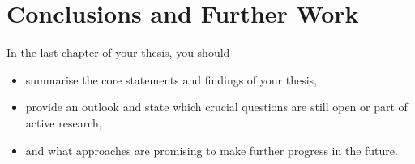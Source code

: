 \chapter{Conclusions and Further Work} 

In the last chapter of your thesis, you should
\begin{itemize}
    \item summarise the core statements and findings of your thesis,
    \item provide an outlook and state which crucial questions are still open or part of
        active research, 
    \item and what approaches are promising to make further progress in the future.
\end{itemize}
